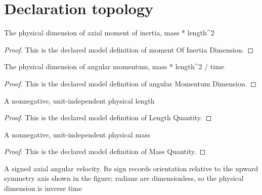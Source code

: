 \section{Declaration topology}
\begin{definition}
  \label{def:physics:phyx-mini-0712:phyxminiproblems-problemphyxmini0712-momentofinertiadimension}
  The physical dimension of axial moment of inertia, mass * length\textasciicircum{}2
\end{definition}
\begin{proof}
  This is the declared model definition of moment Of Inertia Dimension.
\end{proof}
\begin{definition}
  \label{def:physics:phyx-mini-0712:phyxminiproblems-problemphyxmini0712-angularmomentumdimension}
  The physical dimension of angular momentum, mass * length\textasciicircum{}2 / time
\end{definition}
\begin{proof}
  This is the declared model definition of angular Momentum Dimension.
\end{proof}
\begin{definition}
  \label{def:physics:phyx-mini-0712:phyxminiproblems-problemphyxmini0712-lengthquantity}
  A nonnegative, unit-independent physical length
\end{definition}
\begin{proof}
  This is the declared model definition of Length Quantity.
\end{proof}
\begin{definition}
  \label{def:physics:phyx-mini-0712:phyxminiproblems-problemphyxmini0712-massquantity}
  A nonnegative, unit-independent physical mass
\end{definition}
\begin{proof}
  This is the declared model definition of Mass Quantity.
\end{proof}
\begin{definition}
  \label{def:physics:phyx-mini-0712:phyxminiproblems-problemphyxmini0712-axialangularvelocity}
  A signed axial angular velocity. Its sign records orientation relative to the upward symmetry axis shown in the figure; radians are dimensionless, so the physical dimension is inverse time
\end{definition}
